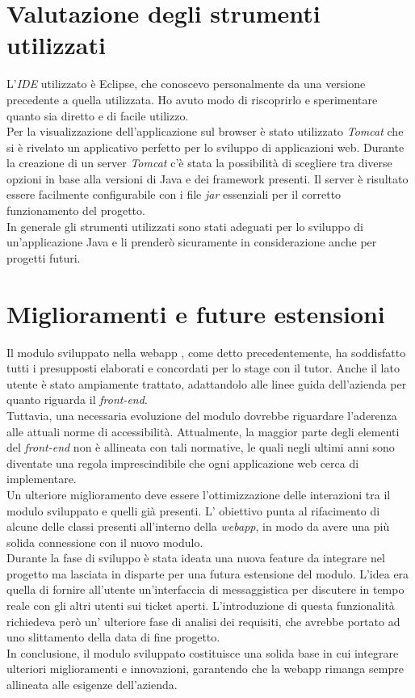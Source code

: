 \section{Valutazione degli strumenti utilizzati}
L'\textit{IDE} utilizzato è Eclipse, che conoscevo personalmente da una versione precedente a quella utilizzata. Ho avuto modo di riscoprirlo e sperimentare quanto sia diretto e di facile utilizzo.\\
Per la visualizzazione dell'applicazione sul browser è stato utilizzato \textit{Tomcat} che si è rivelato un applicativo perfetto per lo sviluppo di applicazioni web. Durante la creazione di un server \textit{Tomcat} c'è stata la possibilità di scegliere tra diverse opzioni in base alla versioni di Java e dei framework presenti. Il server è risultato essere facilmente configurabile con i file \textit{jar} essenziali per il corretto funzionamento del progetto.\\
In generale gli strumenti utilizzati sono stati adeguati per lo sviluppo di un'applicazione Java e li prenderò sicuramente in considerazione anche per progetti futuri.
 
\section{Miglioramenti e future estensioni}
Il modulo sviluppato nella webapp , come detto precedentemente, ha soddisfatto tutti i presupposti elaborati e concordati per lo stage con il tutor. Anche il lato utente è stato ampiamente trattato, adattandolo alle linee guida dell'azienda per quanto riguarda il \textit{front-end}.\\
Tuttavia, una necessaria evoluzione del modulo dovrebbe riguardare l'aderenza alle attuali norme di accessibilità.  Attualmente, la maggior parte degli elementi del \textit{front-end} non è allineata con tali normative, le quali negli ultimi anni sono diventate una regola imprescindibile che ogni applicazione web cerca di implementare.\\
Un ulteriore miglioramento deve essere l'ottimizzazione delle interazioni tra il modulo sviluppato e quelli già presenti. L' obiettivo punta al rifacimento di alcune delle classi presenti all'interno della \textit{webapp}, in modo da avere una più solida connessione con il nuovo modulo. \\
Durante la fase di sviluppo è stata ideata una nuova feature da integrare nel progetto ma lasciata in disparte per una futura estensione del modulo. L'idea era quella di fornire all'utente un'interfaccia di messaggistica per discutere in tempo reale con gli altri utenti sui ticket aperti. L'introduzione di questa funzionalità richiedeva però un' ulteriore fase di analisi dei requisiti, che avrebbe portato ad uno slittamento della data di fine progetto. \\
In conclusione, il modulo sviluppato costituisce una solida base in cui integrare ulteriori miglioramenti e innovazioni, garantendo che la webapp rimanga sempre allineata alle esigenze dell'azienda.
\clearpage
\mbox{}
\newpage